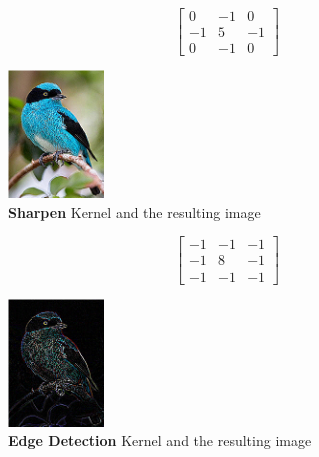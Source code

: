 \FloatBarrier
\begin{figure}[ht]
\begin{minipage}[b]{0.5\linewidth}
\centering
    $$
    \quad
    \begin{bmatrix} 
    0 & -1 & 0 \\
    -1 & 5 & -1 \\
    0 & -1 & 0
    \end{bmatrix}
    $$
\caption{\textbf{Sharpen} Kernel and the resulting image}
\end{minipage}
\begin{minipage}[b]{0.3\linewidth}
\centering
\includegraphics[width=1in]{graphics/convolution/Convolution_gebs_KernelSharpen.png}
\end{minipage}
\label{fig:Sharpen Kernel}
\end{figure}
\FloatBarrier
\begin{figure}[ht]
\begin{minipage}[b]{0.5\linewidth}
\centering
    $$
    \quad
    \begin{bmatrix} 
    -1 & -1 & -1 \\
    -1 & 8 & -1 \\
    -1 & -1 & -1
    \end{bmatrix}
    $$
\caption{\textbf{Edge Detection} Kernel and the resulting image}
\end{minipage}
\begin{minipage}[b]{0.3\linewidth}
\centering
\includegraphics[width=1in]{graphics/convolution/Convolution_gebs_KernelEdgeDetection.png}
\end{minipage}
\label{fig:Edge Detection Kernel}
\end{figure}
\FloatBarrier
